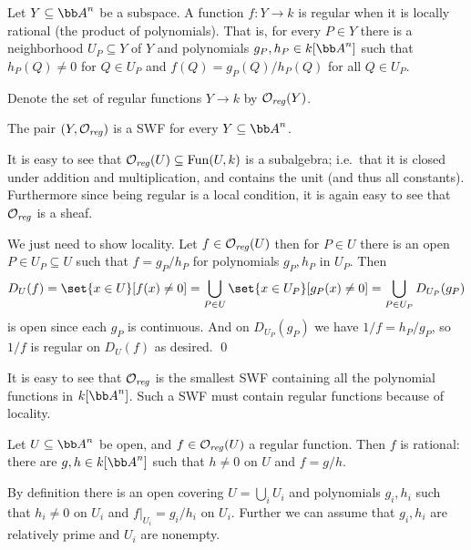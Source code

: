 \bdefn

    Let $Y\subseteq\bA^n$ be a subspace.
    A function $f\colon Y\to k$ is {\emphcolor regular} when it is locally rational (the product of polynomials).
    That is, for every $P\in Y$ there is a neighborhood $U_P\subseteq Y$ of $Y$ and polynomials $g_P,h_P\in k[\bA^n]$ such that
    $h_P(Q)\neq0$ for $Q\in U_P$ and $f(Q)=g_P(Q)/h_P(Q)$ for all $Q\in U_P$.

    Denote the set of regular functions $Y\to k$ by ${{\cal O}}_{\it reg}(Y)$.

\edefn

\blemm

    The pair $(Y,{{\cal O}}_{\it reg})$ is a SWF for every $Y\subseteq\bA^n$.

\elemm

\bproof

    It is easy to see that ${{\cal O}}_{\it reg}(U)\subseteq{\rm Fun}(U,k)$ is a subalgebra; i.e.\ that it is closed under addition and multiplication,
    and contains the unit (and thus all constants).
    Furthermore since being regular is a local condition, it is again easy to see that ${{\cal O}}_{\it reg}$ is a sheaf.

    We just need to show locality.
    Let $f\in{{\cal O}}_{\it reg}(U)$ then for $P\in U$ there is an open $P\in U_P\subseteq U$ such that $f=g_P/h_P$ for polynomials $g_P,h_P$
    in $U_P$.
    Then
    $$ D_U(f) = \set{x\in U}[f(x)\neq0] = \bigcup_{P\in U}\set{x\in U_P}[g_P(x)\neq0] = \bigcup_{P\in U_P}D_{U_P}(g_P) $$
    is open since each $g_P$ is continuous.
    And on $D_{U_P}(g_P)$ we have $1/f=h_P/g_P$, so $1/f$ is regular on $D_U(f)$ as desired.
    \qed

\eproof

\bnote

    It is easy to see that ${{\cal O}}_{\it reg}$ is the smallest SWF containing all the polynomial functions in $k[\bA^n]$.
    Such a SWF must contain regular functions because of locality.

\enote

\blemm

    Let $U\subseteq\bA^n$ be open, and $f\in{{\cal O}}_{\it reg}(U)$ a regular function.
    Then $f$ is rational: there are $g,h\in k[\bA^n]$ such that $h\neq0$ on $U$ and $f=g/h$.

\elemm

\bproof

    By definition there is an open covering $U=\bigcup_iU_i$ and polynomials $g_i,h_i$ such that $h_i\neq0$ on $U_i$
    and $f|_{U_i}=g_i/h_i$ on $U_i$.
    Further we can assume that $g_i,h_i$ are relatively prime and $U_i$ are nonempty.


